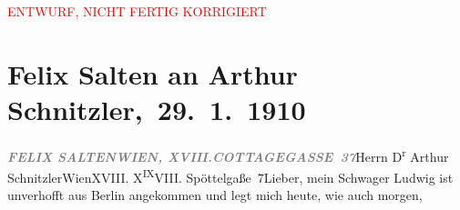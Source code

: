 
\begin{center}
            \textcolor{red}{ENTWURF, NICHT FERTIG KORRIGIERT}
                      \end{center}
            
         
         \renewcommand{\erwaehntePersonen}{Personen: Alfred von Berger, Ludwig Metzl, Felix Salten, Ottilie Salten}
         \renewcommand{\erwaehnteInstitutionen}{Institutionen: Burgtheater}
         \renewcommand{\erwaehnteOrte}{Orte: Berlin, Cottagegasse, Edmund-Weiß-Gasse 7, Wien, XVIII., Währing}
         \renewcommand{\erwaehnteWerke}{Werke: Der junge Medardus. Dramatische Historie in einem Vorspiel und fünf Aufzügen}
               \section[ Felix Salten an Arthur Schnitzler, 29. 1. 1910]{ Felix Salten an Arthur Schnitzler, 29. 1. 1910}\nopagebreak{}\rehead{ }\begin{ledgroupsized}[t]{13cm}\normalsize\beginnumbering \toendnotes[C]{\smallbreak\pagebreak[2]} 
\toendnotes[C]{\smallbreak}\pstart{}{\pb}\textcolor{gray}{\textbf{\textit{FELIX SALTEN}}}\pend{}\pstart{}\textcolor{gray}{\textbf{\textit{WIEN, XVIII.}}}\pend{}\pstart{}\textcolor{gray}{\textbf{\textit{COTTAGEGASSE 37}}}\pend{}{\bigskip}\pstart{}Herrn D\textsuperscript{r} Arthur Schnitzler\pend{}\pstart{}Wien\pend{}\pstart{}XVIII. X\substVorne{}\textsuperscript{IX}\substDazwischen{}VI\substHinten{}II. Spöttelgaße 7\pend{}{\bigskip}\pstart{}{\pb}Lieber,\pend\pstart
           mein Schwager Ludwig ist unverhofft aus Berlin angekommen und legt mich heute, wie auch morgen,

\end{ledgroupsized}
